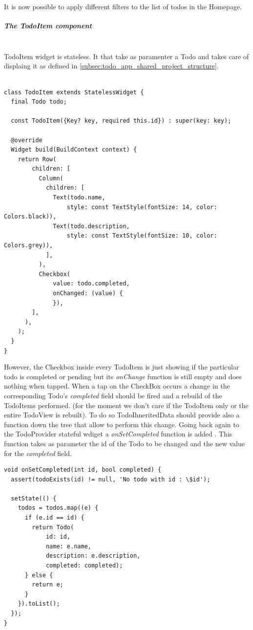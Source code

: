 It is now possible to apply different filters to the list of todos in the Homepage. 


\subparagraph{The TodoItem component}\mbox{}\\
\label{subpar:inheritedWidget_todoitem_component}
TodoItem widget is stateless. It that take as paramenter a Todo and takes care of displaing it as defined in \ref{subsec:todo_app_shared_project_structure}.
\mbox{}\\


\begin{verbatim}

class TodoItem extends StatelessWidget {
  final Todo todo;

  const TodoItem({Key? key, required this.id}) : super(key: key);

  @override
  Widget build(BuildContext context) {
    return Row(
        children: [
          Column(
            children: [
              Text(todo.name,
                  style: const TextStyle(fontSize: 14, color: Colors.black)),
              Text(todo.description,
                  style: const TextStyle(fontSize: 10, color: Colors.grey)),
            ],
          ),
          Checkbox(
              value: todo.completed,
              onChanged: (value) {
              }),
        ],
      ),
    );
  }
}
\end{verbatim}

However, the Checkbox inside every TodoItem is just showing if the particular todo is completed or pending but its \textit{onChange   }function is still empty and does nothing when tapped. When a tap on the CheckBox occurs a change in the corresponding Todo’s \textit{completed }field should be fired and a rebuild of the TodoItems performed. (for the moment we don’t care if the TodoItem only or the entire TodoView is rebuilt). To do so TodoIhneritedData should provide also a function down the tree that allow to perform this change. Going back again to the TodoProvider stateful wdiget a \textit{onSetCompleted  }function is added . This function takes as parameter the id of the Todo to be changed and the new value for the \textit{completed }field.
\mbox{}\\


\begin{verbatim}
void onSetCompleted(int id, bool completed) {
  assert(todoExists(id) != null, 'No todo with id : \$id');

  setState(() {
    todos = todos.map((e) {
      if (e.id == id) {
        return Todo(
            id: id,
            name: e.name,
            description: e.description,
            completed: completed);
      } else {
        return e;
      }
    }).toList();
  });
}
\end{verbatim}

